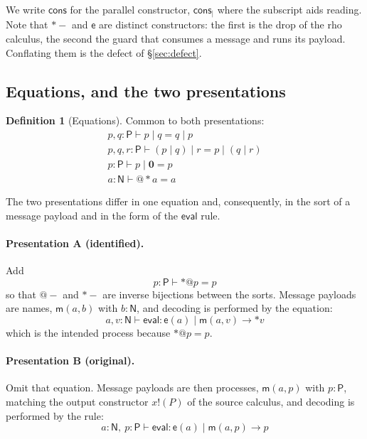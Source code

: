\documentclass[11pt]{article}
\makeatletter
\theoremstyle{plain}
\theoremstyle{definition}
\newtheorem{definition}[theorem]{Definition}
\theoremstyle{remark}
\newcommand{\quo}[1]{@#1}
\newcommand{\drp}[1]{{*}#1}
\newcommand{\out}[2]{#1!(#2)}
\newcommand{\nil}{\mathbf{0}}
\newcommand{\mm}{\mathsf{m}}
\newcommand{\ev}{\mathsf{e}}
\newcommand{\cons}{\mathsf{cons}}
\newcommand{\red}{\longrightarrow}
\makeatother
\begin{document}
We write $\cons$ for the parallel constructor, $\cons_{\mid}$ where the
subscript aids reading. Note that $\drp{-}$ and $\ev$ are distinct
constructors: the first is the drop of the rho calculus, the second the guard
that consumes a message and runs its payload. Conflating them is the defect
of \S\ref{sec:defect}.

\subsection{Equations, and the two presentations}
\label{sec:two}

\begin{definition}[Equations]
\label{def:combcong}
Common to both presentations:
\[
\begin{array}{l}
 p,q : \mathsf{P} \vdash p \mid q = q \mid p\\
 p,q,r : \mathsf{P} \vdash (p \mid q) \mid r = p \mid (q \mid r)\\
 p : \mathsf{P} \vdash p \mid \nil = p\\
 a : \mathsf{N} \vdash \quo{\drp{a}} = a
\end{array}
\]
\end{definition}

The two presentations differ in one equation and, consequently, in the sort
of a message payload and in the form of the $\mathsf{eval}$ rule.

\paragraph{Presentation A (identified).} Add
\[
  p : \mathsf{P} \vdash \drp{\quo{p}} = p
\]
so that $\quo{-}$ and $\drp{-}$ are inverse bijections between the sorts.
Message payloads are names, $\mm(a,b)$ with $b : \mathsf{N}$, and decoding is
performed by the equation:
\[
  a,v : \mathsf{N} \vdash \mathsf{eval} : \ev(a) \mid \mm(a,v) \red \drp{v}
\]
which is the intended process because $\drp{\quo{p}} = p$.

\paragraph{Presentation B (original).} Omit that equation. Message payloads
are then processes, $\mm(a,p)$ with $p : \mathsf{P}$, matching the output
constructor $\out{x}{P}$ of the source calculus, and decoding is performed by
the rule:
\[
  a : \mathsf{N},\ p : \mathsf{P} \vdash \mathsf{eval} :
  \ev(a) \mid \mm(a,p) \red p
\]
\end{document}
